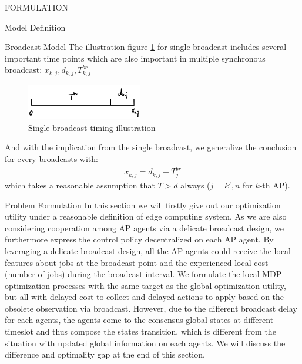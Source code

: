 \documentclass[10pt, conference, letterpaper]{IEEEtran}
\begin{document}
\begin{section}{FORMULATION}
\begin{subsection}{Model Definition}
\begin{subsubsection}{Broadcast Model}
                The illustration figure \ref{fig:brd} for single broadcast includes several important time points which are also important in multiple synchronous broadcast: $x_{k,j}, d_{k,j}, T^{br}_{k,j}$
                \begin{figure}[h]
                    \centering
                    \includegraphics[width=0.45\textwidth]{single-broadcast.png}
                    \caption{Single broadcast timing illustration}
                    \label{fig:brd}
                \end{figure}
                And with the implication from the single broadcast, we generalize the conclusion for every broadcasts with:
                \begin{align}
                    x_{k,j} = d_{k,j} + T^{br}_{j}
                \end{align}
                which takes a reasonable assumption that $T>d$ always ($j=k',n$ for $k$-th AP).
            \end{subsubsection}
        \end{subsection}

        \begin{subsection}{Problem Formulation}
            In this section we will firstly give out our optimization utility under a reasonable definition of edge computing system. As we are also considering cooperation among AP agents via a delicate broadcast design, we furthermore express the control policy decentralized on each AP agent.
            By leveraging a delicate broadcast design, all the AP agents could receive the local features about jobs at the broadcast point and the experienced local cost (number of jobs) during the broadcast interval.
            We formulate the local MDP optimization processes with the same target as the global optimization utility, but all with delayed cost to collect and delayed actions to apply based on the obsolete observation via broadcast. However, due to the different broadcast delay for each agents, the agents come to the consensus global states at different timeslot and thus compose the states transition, which is different from the situation with updated global information on each agents. We will discuss the difference and optimality gap at the end of this section.


\end{subsection}
\end{section}
\end{document}
